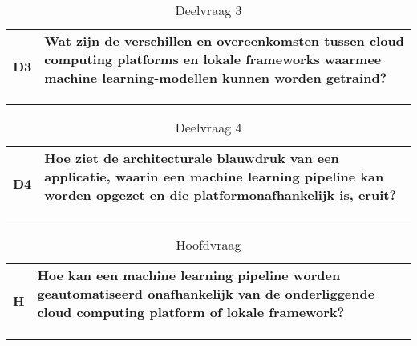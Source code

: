 \begin{table}[hbt!]
  \centering
  \begin{tabular}{|c|l|l|}
  \hline
  \multirow{4}{*}{\textbf{D3}} & \multicolumn{2}{p{.9155\linewidth}|}{\textbf{Wat zijn de verschillen en overeenkomsten tussen cloud computing platforms en lokale frameworks waarmee machine learning-modellen kunnen worden getraind?
  }} \\ \cline{2-3} 
                             & \textbf{}&\\ \cline{2-3} 
                             & \textbf{}&\\ \cline{2-3} 
                             & \textbf{}&\\ \hline
  \end{tabular}
  \caption{Deelvraag 3}
  \label{table:sq3}
\end{table}

\begin{table}[hbt!]
  \centering
  \begin{tabular}{|c|l|l|}
  \hline
  \multirow{4}{*}{\textbf{D4}} & \multicolumn{2}{p{.9155\linewidth}|}{\textbf{Hoe ziet de architecturale blauwdruk van een applicatie, waarin een machine learning pipeline kan worden opgezet en die platformonafhankelijk is, eruit?
  }} \\ \cline{2-3} 
                             & \textbf{}&\\ \cline{2-3} 
                             & \textbf{}&\\ \cline{2-3} 
                             & \textbf{}&\\ \hline
  \end{tabular}
  \caption{Deelvraag 4}
  \label{table:sq4}
\end{table}

\begin{table}[hbt!]
  \centering
  \begin{tabular}{|c|l|l|}
  \hline
  \multirow{4}{*}{\textbf{H}} & \multicolumn{2}{p{.9155\linewidth}|}{\textbf{Hoe kan een machine learning pipeline worden geautomatiseerd onafhankelijk van de onderliggende cloud computing platform of lokale framework?}} \\ \cline{2-3} 
                             & \textbf{}&\\ \cline{2-3} 
                             & \textbf{}&\\ \cline{2-3} 
                             & \textbf{}&\\ \hline
  \end{tabular}
  \caption{Hoofdvraag}
  \label{table:mq}
\end{table}